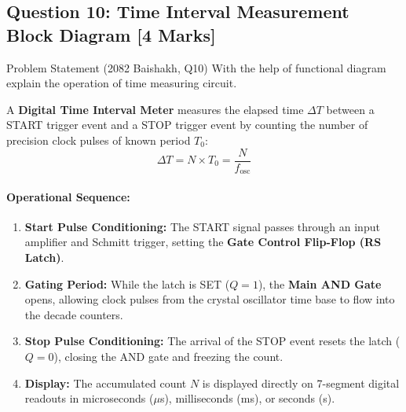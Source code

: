 \documentclass[11pt,a4paper,oneside]{book}
\begin{document}
\subsection{Question 10: Time Interval Measurement Block Diagram [4 Marks]}
\begin{questionbox}{Problem Statement (2082 Baishakh, Q10)}
With the help of functional diagram explain the operation of time measuring circuit.
\end{questionbox}

A \textbf{Digital Time Interval Meter} measures the elapsed time $\Delta T$ between a START trigger event and a STOP trigger event by counting the number of precision clock pulses of known period $T_0$:
\[
\Delta T = N \times T_0 = \frac{N}{f_{\text{osc}}}
\]

\paragraph{Operational Sequence:}
\begin{enumerate}
  \item \textbf{Start Pulse Conditioning:} The START signal passes through an input amplifier and Schmitt trigger, setting the \textbf{Gate Control Flip-Flop (RS Latch)}.
  \item \textbf{Gating Period:} While the latch is SET ($Q=1$), the \textbf{Main AND Gate} opens, allowing clock pulses from the crystal oscillator time base to flow into the decade counters.
  \item \textbf{Stop Pulse Conditioning:} The arrival of the STOP event resets the latch ($Q=0$), closing the AND gate and freezing the count.
  \item \textbf{Display:} The accumulated count $N$ is displayed directly on 7-segment digital readouts in microseconds ($\mu$s), milliseconds (ms), or seconds (s).
\end{enumerate}
\end{document}
